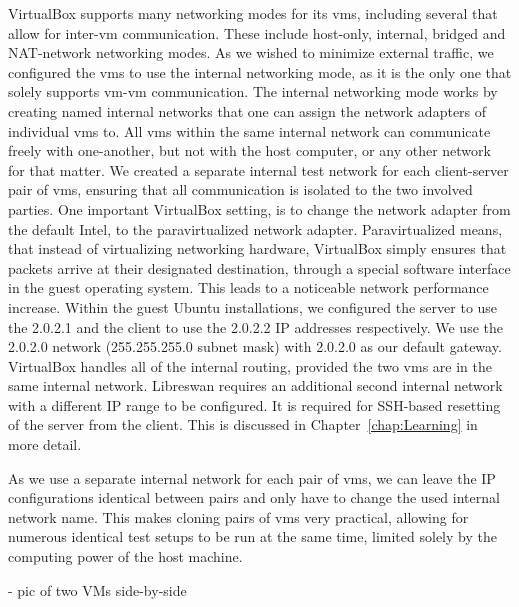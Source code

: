 VirtualBox supports many networking modes for its \acp{vm}, including several that allow for inter-\ac{vm} communication. These include host-only, internal, bridged and NAT-network networking modes.
As we wished to minimize external traffic, we configured the \acp{vm} to use the internal networking mode, as it is the only one that solely supports \ac{vm}-\ac{vm} communication.
The internal networking mode works by creating named internal networks that one can assign the network adapters of individual \acp{vm} to. All \acp{vm} within the same internal network can communicate freely with one-another, but not with the host computer, or any other network for that matter. We created a separate internal test network for each client-server pair of \acp{vm}, ensuring that all communication is isolated to the two involved parties. One important VirtualBox setting, is to change the network adapter from the default Intel, to the paravirtualized network adapter. Paravirtualized means, that instead of virtualizing networking hardware, VirtualBox simply ensures that packets arrive at their designated destination, through a special software interface in the guest operating system. This leads to a noticeable network performance increase. Within the guest Ubuntu installations, we configured the server to use the 2.0.2.1 and the client to use the 2.0.2.2 IP addresses respectively. We use the 2.0.2.0 network (255.255.255.0 subnet mask) with 2.0.2.0 as our default gateway. VirtualBox handles all of the internal routing, provided the two \acp{vm} are in the same internal network. Libreswan requires an additional second internal network with a different IP range to be configured. It is required for SSH-based resetting of the server from the client. This is discussed in Chapter~\ref{chap:Learning} in more detail.

As we use a separate internal network for each pair of \acp{vm}, we can leave the IP configurations identical between pairs and only have to change the used internal network name. This makes cloning pairs of \acp{vm} very practical, allowing for numerous identical test setups to be run at the same time, limited solely by the computing power of the host machine.


- pic of two VMs side-by-side

